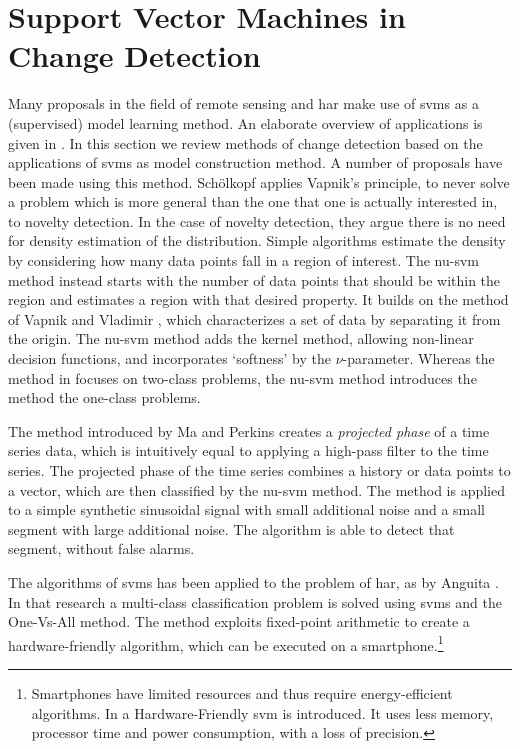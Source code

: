 \section{Support Vector Machines in Change Detection}\label{sec:svm_in_change_detection}

Many proposals in the field of remote sensing and \gls{har} make use of \glspl{svm} as a (supervised) model learning method.
An elaborate overview of applications is given in \cite{mountrakis2011support}.
In this section we review methods of change detection based on the applications of \glspl{svm} as model construction method.
A number of proposals have been made using this method.
Sch{\"o}lkopf \etal \cite{scholkopf1999support} applies Vapnik's principle, to never solve a problem which is more general than the one that one is actually interested in, to novelty detection.
In the case of novelty detection, they argue there is no need for density estimation of the distribution.
Simple algorithms estimate the density by considering how many data points fall in a region of interest.
The \gls{nu-svm} method instead starts with the number of data points that should be within the region and estimates a region with that desired property.
It builds on the method of Vapnik and Vladimir \cite{vapnik1963pattern}, which characterizes a set of data by separating it from the origin.
The \gls{nu-svm} method adds the kernel method, allowing non-linear decision functions, and incorporates `softness' by the $\nu$-parameter.
Whereas the method in \cite{vapnik1963pattern} focuses on two-class problems, the \gls{nu-svm} method introduces the method the one-class problems.

The method introduced by Ma and Perkins \cite{ma2003time} creates a \emph{projected phase} of a time series data, which is intuitively equal to applying a high-pass filter to the time series.
The projected phase of the time series combines a history or data points to a vector, which are then classified by the \gls{nu-svm} method.
The method is applied to a simple synthetic sinusoidal signal with small additional noise and a small segment with large additional noise.
The algorithm is able to detect that segment, without false alarms.

The algorithms of \glspl{svm} has been applied to the problem of \gls{har}, as by Anguita \etal \cite{anguita2012human}.
In that research a multi-class classification problem is solved using \glspl{svm} and the One-Vs-All method.
The method exploits fixed-point arithmetic to create a hardware-friendly algorithm, which can be executed on a smartphone.\footnote{Smartphones have limited resources and thus require energy-efficient algorithms. In \cite{anguita2007hardware} a Hardware-Friendly \gls{svm} is introduced. It uses less memory, processor time and power consumption, with a loss of precision.}

